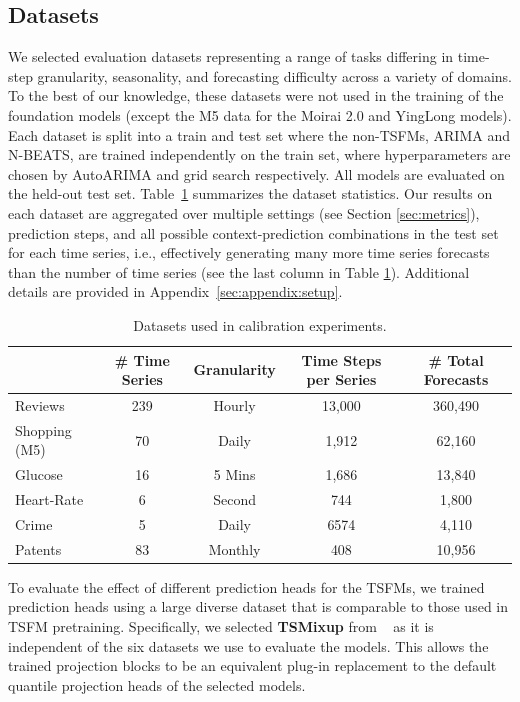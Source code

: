 \documentclass{article}
\begin{document}
\subsection{Datasets}
\label{sec:datasets}

We selected evaluation datasets representing a range of tasks differing in time-step granularity, seasonality, and forecasting difficulty across a variety of domains. 
To the best of our knowledge, these datasets were not used in the training of the foundation models (except the M5 data for the Moirai 2.0 and YingLong models). 
Each dataset is split into a train and test set where the non-TSFMs, ARIMA and N-BEATS, are trained independently on the train set, where hyperparameters are chosen by AutoARIMA and grid search respectively. 
All models are evaluated on the held-out test set. 
Table~\ref{tab:dataset_info} summarizes the dataset statistics. Our results on each dataset are aggregated over multiple settings (see Section \ref{sec:metrics}), prediction steps, and all possible context-prediction combinations in the test set for each time series, i.e., effectively generating many more time series forecasts than the number of time series (see the last column in Table \ref{tab:dataset_info}). Additional details are provided in Appendix~\ref{sec:appendix:setup}.


\begin{table}[ht]
\centering
\caption{Datasets used in calibration experiments.}
\label{tab:dataset_info}
\begin{tabular}{lccc c}
\toprule
 & {\# Time Series} & {Granularity} & {Time Steps per Series} & \# Total Forecasts \\
 \midrule
{Reviews} & {239} & {Hourly} & {13,000}& {360,490} \\
{Shopping (M5)} & {70} & {Daily} & {1,912} & {62,160} \\
{Glucose} & {16} & {5 Mins} & {1,686} & {13,840} \\
{Heart-Rate} & {6} & {Second} & {744} & {1,800} \\
{Crime} & {5} & {Daily} & {6574} & {4,110} \\
{Patents} & {83} & {Monthly} & {408} & {10,956} \\
\bottomrule
\end{tabular}
\end{table}

To evaluate the effect of different prediction heads for the TSFMs, we trained prediction heads using a large diverse dataset that is comparable to those used in TSFM pretraining.
Specifically, we selected \textbf{TSMixup} from ~\citet{chronos} as it is independent of the six datasets we use to evaluate the models.
This allows the trained projection blocks to be an equivalent plug-in replacement to the default quantile projection heads of the selected models.
\end{document}
